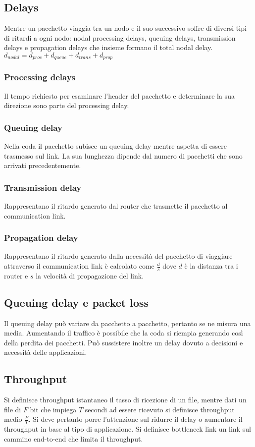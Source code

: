 \subsection{Delays}
Mentre un pacchetto viaggia tra un nodo e il suo successivo soffre di diversi tipi di ritardi a ogni nodo: nodal processing delays, queuing delays, transmission delays e propagation delays che insieme formano il
total nodal delay. $d_{nodal}=d_{proc}+d_{queue}+d_{trans}+d_{prop}$
\subsubsection{Processing delays}
Il tempo richiesto per esaminare l'header del pacchetto e determinare la sua direzione sono parte del processing delay. 
\subsubsection{Queuing delay}
Nella coda il pacchetto subisce un queuing delay mentre aspetta di essere trasmesso sul link. La sua lunghezza dipende dal numero di pacchetti che sono arrivati precedentemente. 
\subsubsection{Transmission delay}
Rappresentano il ritardo generato dal router che trasmette il pacchetto al communication link.
\subsubsection{Propagation delay}
Rappresentano il ritardo generato dalla necessit\`a del pacchetto di viaggiare attraverso il communication link \`e calcolato come $\frac{d}{s}$ dove $d$ \`e la distanza tra i router e $s$ la velocit\`a di 
propagazione del link. 
\subsection{Queuing delay e packet loss}
Il queuing delay pu\`o variare da pacchetto a pacchetto, pertanto se ne misura una media. Aumentando il traffico \`e possibile che la coda si riempia generando cos\`i della perdita dei pacchetti. Pu\`o sussistere
inoltre un delay dovuto a decisioni e necessit\`a delle applicazioni.
\subsection{Throughput}
Si definisce throughput istantaneo il tasso di ricezione di un file, mentre dati un file di $F$ bit che impiega $T$ secondi ad essere ricevuto si definisce throughput medio $\frac{F}{T}$. Si deve pertanto porre
l'attenzione sul ridurre il delay o aumentare il throughput in base al tipo di applicazione. Si definisce bottleneck link un link sul
cammino end-to-end che limita il throughput.
